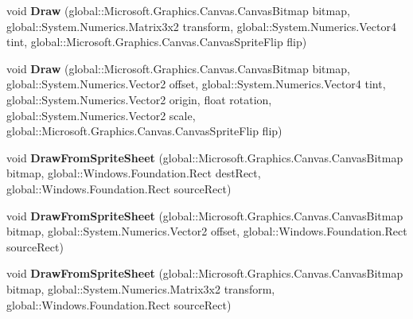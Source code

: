 \begin{DoxyCompactItemize}
void {\bfseries Draw} (global\+::\+Microsoft.\+Graphics.\+Canvas.\+Canvas\+Bitmap bitmap, global\+::\+System.\+Numerics.\+Matrix3x2 transform, global\+::\+System.\+Numerics.\+Vector4 tint, global\+::\+Microsoft.\+Graphics.\+Canvas.\+Canvas\+Sprite\+Flip flip)
\item 
\mbox{\label{interface_microsoft_1_1_graphics_1_1_canvas_1_1_i_canvas_sprite_batch_a6c8abe6402266b85e01ea6236060016d}} 
void {\bfseries Draw} (global\+::\+Microsoft.\+Graphics.\+Canvas.\+Canvas\+Bitmap bitmap, global\+::\+System.\+Numerics.\+Vector2 offset, global\+::\+System.\+Numerics.\+Vector4 tint, global\+::\+System.\+Numerics.\+Vector2 origin, float rotation, global\+::\+System.\+Numerics.\+Vector2 scale, global\+::\+Microsoft.\+Graphics.\+Canvas.\+Canvas\+Sprite\+Flip flip)
\item 
\mbox{\label{interface_microsoft_1_1_graphics_1_1_canvas_1_1_i_canvas_sprite_batch_aa1520881b529a87baf47530abaa95312}} 
void {\bfseries Draw\+From\+Sprite\+Sheet} (global\+::\+Microsoft.\+Graphics.\+Canvas.\+Canvas\+Bitmap bitmap, global\+::\+Windows.\+Foundation.\+Rect dest\+Rect, global\+::\+Windows.\+Foundation.\+Rect source\+Rect)
\item 
\mbox{\label{interface_microsoft_1_1_graphics_1_1_canvas_1_1_i_canvas_sprite_batch_af0f7c640338b4036dade8bebfe7d6efe}} 
void {\bfseries Draw\+From\+Sprite\+Sheet} (global\+::\+Microsoft.\+Graphics.\+Canvas.\+Canvas\+Bitmap bitmap, global\+::\+System.\+Numerics.\+Vector2 offset, global\+::\+Windows.\+Foundation.\+Rect source\+Rect)
\item 
\mbox{\label{interface_microsoft_1_1_graphics_1_1_canvas_1_1_i_canvas_sprite_batch_aed698fc040f38b63a71e4d1e7ea21837}} 
void {\bfseries Draw\+From\+Sprite\+Sheet} (global\+::\+Microsoft.\+Graphics.\+Canvas.\+Canvas\+Bitmap bitmap, global\+::\+System.\+Numerics.\+Matrix3x2 transform, global\+::\+Windows.\+Foundation.\+Rect source\+Rect)
\item 
\mbox{\label{interface_microsoft_1_1_graphics_1_1_canvas_1_1_i_canvas_sprite_batch_a176d58742b3a6407e8ff6d87566b932c}} 

\end{DoxyCompactItemize}

